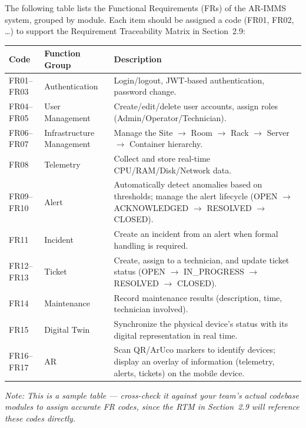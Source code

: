 \documentclass[12pt]{article}
\begin{document}
The following table lists the Functional Requirements (FRs) of the AR-IMMS system, grouped by module. Each item should be assigned a code (FR01, FR02, \ldots) to support the Requirement Traceability Matrix in Section~2.9:

\begin{longtable}{L{2.1cm} L{3.4cm} L{8.2cm}}
\toprule
\textbf{Code} & \textbf{Function Group} & \textbf{Description} \\
\midrule
\endhead
FR01--FR03 & Authentication & Login/logout, JWT-based authentication, password change. \\[4pt]
FR04--FR05 & User Management & Create/edit/delete user accounts, assign roles (Admin/Operator/Technician). \\[4pt]
FR06--FR07 & Infrastructure Management & Manage the Site $\rightarrow$ Room $\rightarrow$ Rack $\rightarrow$ Server $\rightarrow$ Container hierarchy. \\[4pt]
FR08 & Telemetry & Collect and store real-time CPU/RAM/Disk/Network data. \\[4pt]
FR09--FR10 & Alert & Automatically detect anomalies based on thresholds; manage the alert lifecycle (OPEN $\rightarrow$ ACKNOWLEDGED $\rightarrow$ RESOLVED $\rightarrow$ CLOSED). \\[4pt]
FR11 & Incident & Create an incident from an alert when formal handling is required. \\[4pt]
FR12--FR13 & Ticket & Create, assign to a technician, and update ticket status (OPEN $\rightarrow$ IN\_PROGRESS $\rightarrow$ RESOLVED $\rightarrow$ CLOSED). \\[4pt]
FR14 & Maintenance & Record maintenance results (description, time, technician involved). \\[4pt]
FR15 & Digital Twin & Synchronize the physical device's status with its digital representation in real time. \\[4pt]
FR16--FR17 & AR & Scan QR/ArUco markers to identify devices; display an overlay of information (telemetry, alerts, tickets) on the mobile device. \\
\bottomrule
\end{longtable}

\textit{Note: This is a sample table --- cross-check it against your team's actual codebase modules to assign accurate FR codes, since the RTM in Section~2.9 will reference these codes directly.}
\end{document}
